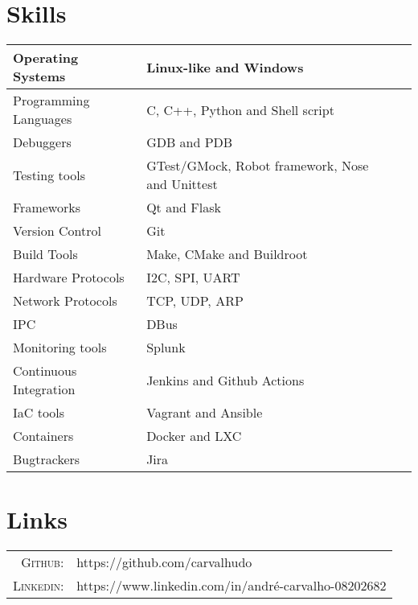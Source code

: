 \documentclass[a4paper,10pt]{article}
\begin{document}
\section{Skills}
\begin{center}
    \begin{tabular}{| l | l | l | l |}
    \hline
    Operating Systems & Linux-like and Windows\\ \hline
    Programming Languages & C, C++, Python and Shell script\\ \hline
    Debuggers & GDB and PDB \\ \hline
    Testing tools & GTest/GMock, Robot framework, Nose and Unittest\\ \hline
    Frameworks & Qt and Flask\\ \hline
    Version Control & Git\\ \hline
    Build Tools & Make, CMake and Buildroot\\ \hline
    Hardware Protocols & I2C, SPI, UART\\ \hline
    Network Protocols & TCP, UDP, ARP\\ \hline
    IPC & DBus\\ \hline
    Monitoring tools & Splunk\\ \hline
    Continuous Integration & Jenkins and Github Actions\\ \hline
    IaC tools & Vagrant and Ansible\\ \hline
    Containers & Docker and LXC\\ \hline
    Bugtrackers & Jira\\ \hline
    \end{tabular}
\end{center}

\section{Links}
\begin{tabular}{rl}
\textsc{Github:}& https://github.com/carvalhudo\\
\textsc{Linkedin:}&https://www.linkedin.com/in/andré-carvalho-08202682 \\
\end{tabular}
\end{document}
